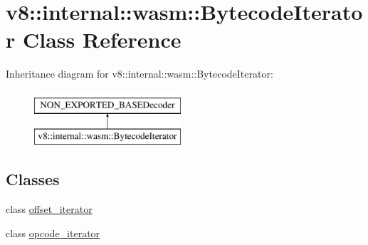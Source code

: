 \hypertarget{classv8_1_1internal_1_1wasm_1_1BytecodeIterator}{}\section{v8\+:\+:internal\+:\+:wasm\+:\+:Bytecode\+Iterator Class Reference}
\label{classv8_1_1internal_1_1wasm_1_1BytecodeIterator}
Inheritance diagram for v8\+:\+:internal\+:\+:wasm\+:\+:Bytecode\+Iterator\+:\begin{figure}[H]
\begin{center}
\leavevmode
\includegraphics[height=2.000000cm]{classv8_1_1internal_1_1wasm_1_1BytecodeIterator}
\end{center}
\end{figure}
\subsection*{Classes}
\begin{DoxyCompactItemize}
\item 
class \mbox{\hyperlink{classv8_1_1internal_1_1wasm_1_1BytecodeIterator_1_1offset__iterator}{offset\+\_\+iterator}}
\item 
class \mbox{\hyperlink{classv8_1_1internal_1_1wasm_1_1BytecodeIterator_1_1opcode__iterator}{opcode\+\_\+iterator}}
\end{DoxyCompactItemize}
